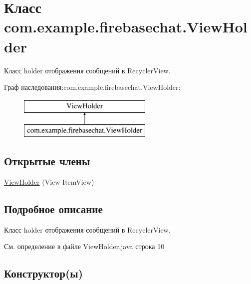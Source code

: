 \hypertarget{classcom_1_1example_1_1firebasechat_1_1_view_holder}{}\section{Класс com.\+example.\+firebasechat.\+View\+Holder}
\label{classcom_1_1example_1_1firebasechat_1_1_view_holder}


Класс holder отображения сообщений в Recycler\+View.  


Граф наследования\+:com.\+example.\+firebasechat.\+View\+Holder\+:\begin{figure}[H]
\begin{center}
\leavevmode
\includegraphics[height=2.000000cm]{classcom_1_1example_1_1firebasechat_1_1_view_holder}
\end{center}
\end{figure}
\subsection*{Открытые члены}
\begin{DoxyCompactItemize}
\item 
\mbox{\hyperlink{classcom_1_1example_1_1firebasechat_1_1_view_holder_a6659514a237d574a53725eead8789579}{View\+Holder}} (View Item\+View)
\end{DoxyCompactItemize}


\subsection{Подробное описание}
Класс holder отображения сообщений в Recycler\+View. 

См. определение в файле View\+Holder.\+java строка 10



\subsection{Конструктор(ы)}
\mbox{\label{classcom_1_1example_1_1firebasechat_1_1_view_holder_a6659514a237d574a53725eead8789579}} 
